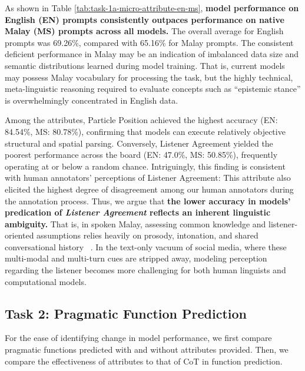 \documentclass[11pt]{article}
\begin{document}
As shown in Table \ref{tab:task-1a-micro-attribute-en-ms}, \textbf{model performance on English (EN) prompts consistently outpaces performance on native Malay (MS) prompts across all models.} The overall average for English prompts was 69.26\%, compared with 65.16\% for Malay prompts. The consistent deficient performance in Malay may be an indication of imbalanced data size and semantic distributions learned during model training. That is, current models may possess Malay vocabulary for processing the task, but the highly technical, meta-linguistic reasoning required to evaluate concepts such as ``epistemic stance'' is overwhelmingly concentrated in English data. 

Among the attributes, Particle Position achieved the highest accuracy (EN: 84.54\%, MS: 80.78\%), confirming that models can execute relatively objective structural and spatial parsing. Conversely, Listener Agreement yielded the poorest performance across the board (EN: 47.0\%, MS: 50.85\%), frequently operating at or below a random chance. Intriguingly, this finding is consistent with human annotators' perceptions of Listener Agreement: This attribute also elicited the highest degree of disagreement among our human annotators during the annotation process. Thus, we argue that \textbf{the lower accuracy in models' predication of \textit{Listener Agreement} reflects an inherent linguistic ambiguity.} That is, in spoken Malay, assessing common knowledge and listener-oriented assumptions relies heavily on prosody, intonation, and shared conversational history ~\citep{tay2016discourse,wong2004particles}. In the text-only vacuum of social media, where these multi-modal and multi-turn cues are stripped away, modeling perception regarding the listener becomes more challenging for both human linguists and computational models.


\subsection{Task 2: Pragmatic Function Prediction}
For the ease of identifying change in model performance, we first compare pragmatic functions predicted with and without attributes provided. Then, we compare the effectiveness of attributes to that of CoT in function prediction. 
\end{document}
